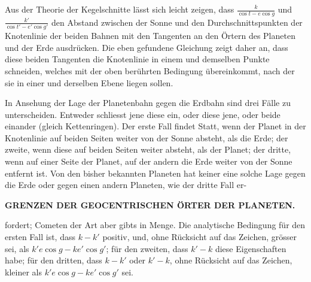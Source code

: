 Aus der Theorie der Kegelschnitte lässt sich leicht zeigen, dass $\frac{k}{\cos t-e\cos g}$
und $\frac{k'}{\cos t'-e'\cos g'}$ den Abstand zwischen der Sonne und den Durchschnittspunkten
der Knotenlinie der beiden Bahnen mit den Tangenten an den Örtern des Planeten
und der Erde ausdrücken. Die eben gefundene Gleichung zeigt daher an,
dass diese beiden Tangenten die Knotenlinie in einem und demselben Punkte
schneiden, welches mit der oben berührten Bedingung übereinkommt, nach der
sie in einer und derselben Ebene liegen sollen.

In Ansehung der Lage der Planetenbahn gegen die Erdbahn sind drei Fälle
zu unterscheiden. Entweder schliesst jene diese ein, oder diese jene, oder beide
einander (gleich Kettenringen). Der erste Fall findet Statt, wenn der Planet in
der Knotenlinie auf beiden Seiten weiter von der Sonne absteht, als die Erde;
der zweite, wenn diese auf beiden Seiten weiter absteht, als der Planet; der
dritte, wenn auf einer Seite der Planet, auf der andern die Erde weiter von der
Sonne entfernt ist. Von den bisher bekannten Planeten hat keiner eine solche
Lage gegen die Erde oder gegen einen andern Planeten, wie der dritte Fall er-\par
\clearpage
\noindent{}%
%
\parbox[t]{\dimexpr\linewidth-24mm\relax}{\centering\fontsize{7.4}{9.2}\selectfont\bfseries GRENZEN DER GEOCENTRISCHEN ÖRTER DER PLANETEN.\par}%
\makebox[12mm][r]{}\par\nobreak\smallskip
\noindent fordert; Cometen der Art aber gibts in Menge. Die analytische Bedingung für
den ersten Fall ist, dass $k-k'$ positiv, und, ohne Rücksicht auf das Zeichen,
grösser sei, als $k'e\cos g-ke'\cos g'$; für den zweiten, dass $k'-k$ diese Eigenschaften
habe; für den dritten, dass $k-k'$ oder $k'-k$, ohne Rücksicht auf das
Zeichen, kleiner als $k'e\cos g-ke'\cos g'$ sei.

